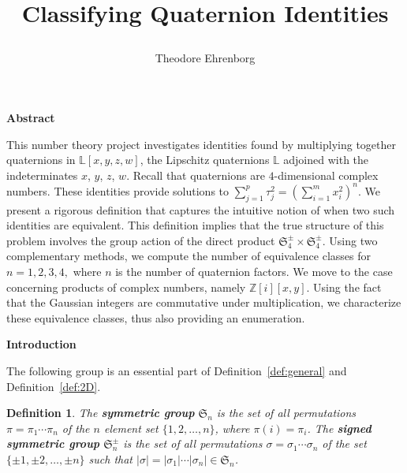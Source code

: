 \documentclass[12pt]{article}
\newtheorem{definition}[theorem]{Definition}
\numberwithin{equation}{section}
\newcommand{\MySpacing}{25}
\newcommand{\MyFontSize}{20}
\newcommand{\MySectionSpacing}{15}
\newcommand{\MySectionFontSize}{40}
\begin{document}
\begin{landscape}

\bf
{
\title
{
\fontsize{120}{150}\selectfont%
\begin{center}
\textbf { Classifying Quaternion Identities }
\end{center}
}
}
\author{
\fontsize{50}{50}\selectfont
\sc Theodore Ehrenborg}
\date{}
\maketitle

\newpage

{\fontsize{\MyFontSize}{\MySpacing}\selectfont%
{


\noindent
\begin{center}
{\fontsize{\MySectionFontSize}{\MySectionSpacing}\selectfont \textbf
 {Abstract}
}
\end{center}

\fontsize{\MyFontSize}{\MySpacing}\selectfont

This number theory project investigates identities found by
multiplying together quaternions in \( \mathbb{L}[x,y,z,w] \), the
Lipschitz quaternions \( \mathbb{L} \) adjoined with the
indeterminates \(x\), \(y\), \(z\), \(w\).  Recall that quaternions
are \(4\)-dimensional complex numbers.  These identities provide
solutions to \( \sum_{j = 1}^{p} \tau_j ^ 2 = \left( \sum_{i = 1}^{m}
x_i ^ 2 \right) ^ n \). We present a rigorous definition that captures
the intuitive notion of when two such identities are equivalent. This
definition implies that the true structure of this problem involves the
group action of the direct product \( \mathfrak{S}_4^\pm \times \mathfrak{S}_4^\pm \).  Using
two complementary methods, we compute the number of equivalence
classes for \(n = 1, 2, 3, 4,\) where \(n\) is the number of
quaternion factors. We move to the case concerning products of complex
numbers, namely \( \mathbb{Z}[i][x,y] \). Using the fact that the
Gaussian integers are commutative under multiplication, we
characterize these equivalence classes, thus also providing an
enumeration.

\newpage

\noindent
\begin{center}
{\fontsize{\MySectionFontSize}{\MySectionSpacing}\selectfont \textbf
 {Introduction}
}
\end{center}


The following group is an essential part of Definition~\ref{def:general}
and Definition~\ref{def:2D}.
\begin{definition}
The {\bf symmetric group} \( \mathfrak{S}_n \) is the 
set of all permutations \( \pi = \pi_1 \cdots \pi_n \) 
of the \( n \) element set \( \{ 1, 2, \ldots, n \} \),
where \( \pi(i) = \pi_i \).
The {\bf signed symmetric group} \( \mathfrak{S}_n^\pm \)
is the set of all permutations \( \sigma = \sigma_1 \cdots \sigma_n\)
of the set \( \{ \pm 1, \pm 2, \ldots, \pm n \} \) such that
\( | \sigma | = | \sigma_1 | \cdots |\sigma_n| \in \mathfrak{S}_n \).
\end{definition}

}}
\end{landscape}
\end{document}
